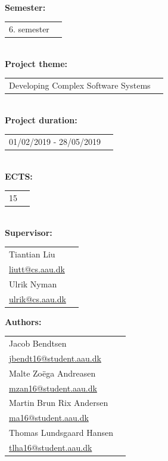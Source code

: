 \newpage
\makeatother
\begin{minipage}[T]{0.45\textwidth}
 \begin{flushleft}
  \textbf{\normalsize{}}\\ \maketitle
  \textbf{\normalsize{Semester:}}\\
  \begin{tabular}{ll}
  \normalsize{6. semester}
  \end{tabular}\\
  \textbf{\normalsize{Project theme:}}\\
  \begin{tabular}{ll}
    \normalsize{Developing Complex Software Systems}
  \end{tabular}\\
  \textbf{\normalsize{Project duration:}}\\
  \begin{tabular}{ll}
    \normalsize{01/02/2019 - 28/05/2019}
  \end{tabular}\\
  \textbf{\normalsize{ECTS:}}\\
  \begin{tabular}{ll}
  	\normalsize{15}
  \end{tabular}\\
  \textbf{\normalsize{Supervisor:}}\\
  \begin{tabular}{ll}
    \normalsize{Tiantian Liu}\\
    \href{mailto:liutt@cs.aau.dk}{liutt@cs.aau.dk}\\
    \normalsize{Ulrik Nyman}\\
    \href{mailto:ulrik@cs.aau.dk}{ulrik@cs.aau.dk}\\
  \end{tabular}

  \textbf{\normalsize{Authors:}}\\
  \begin{tabular}{ll}
   \normalsize{Jacob Bendtsen}\\
   \href{mailto:jbendt16@student.aau.dk}{jbendt16@student.aau.dk}\\
   \normalsize{Malte Zoëga Andreasen}\\
   \href{mailto:mzan16@student.aau.dk}{mzan16@student.aau.dk}\\
   \normalsize{Martin Brun Rix Andersen}\\
   \href{mailto:ma16@student.aau.dk}{ma16@student.aau.dk}\\
   \normalsize{Thomas Lundsgaard Hansen}\\
   \href{mailto:tlha16@student.aau.dk}{tlha16@student.aau.dk}\\
  \end{tabular}
 \end{flushleft}
\end{minipage}
